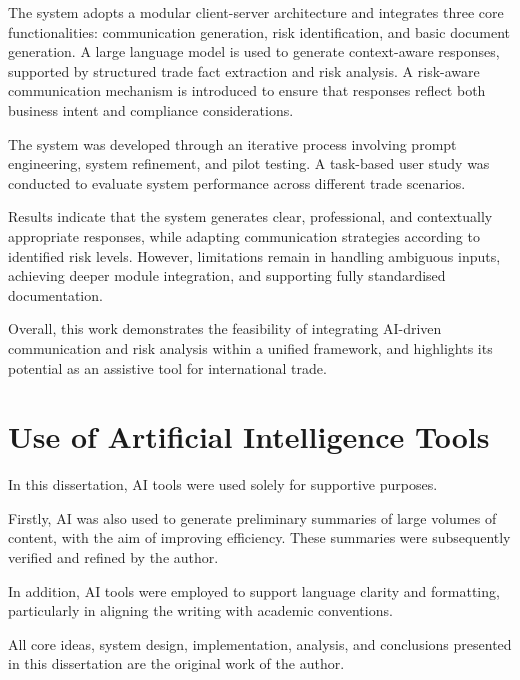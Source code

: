 \documentclass[12pt,a4paper]{report}
\begin{document}
The system adopts a modular client-server architecture and integrates three core functionalities: communication generation, risk identification, and basic document generation. A large language model is used to generate context-aware responses, supported by structured trade fact extraction and risk analysis. A risk-aware communication mechanism is introduced to ensure that responses reflect both business intent and compliance considerations.

The system was developed through an iterative process involving prompt engineering, system refinement, and pilot testing. A task-based user study was conducted to evaluate system performance across different trade scenarios.

Results indicate that the system generates clear, professional, and contextually appropriate responses, while adapting communication strategies according to identified risk levels. However, limitations remain in handling ambiguous inputs, achieving deeper module integration, and supporting fully standardised documentation.

Overall, this work demonstrates the feasibility of integrating AI-driven communication and risk analysis within a unified framework, and highlights its potential as an assistive tool for international trade.

\clearpage
\section*{Use of Artificial Intelligence Tools}

In this dissertation, AI tools were used solely for supportive purposes.

Firstly, AI was also used to generate preliminary summaries of large volumes of content, with the aim of improving efficiency. These summaries were subsequently verified and refined by the author.

In addition, AI tools were employed to support language clarity and formatting, particularly in aligning the writing with academic conventions.

All core ideas, system design, implementation, analysis, and conclusions presented in this dissertation are the original work of the author.
%

\tableofcontents
\end{document}
